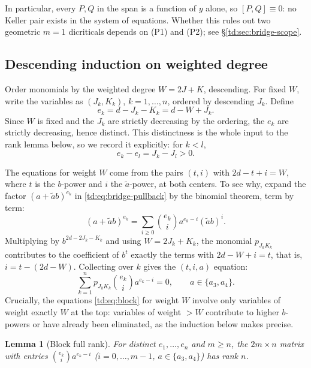 \documentclass[a4paper,11pt]{article}
\theoremstyle{plain}
\newtheorem{lemma}[theorem]{Lemma}
\theoremstyle{definition}
\theoremstyle{remark}
\begin{document}
In particular, every $P, Q$ in the span is a function of $y$ alone, so $[P,Q] \equiv 0$: no
Keller pair exists in the system of equations. Whether this rules out two geometric $m = 1$
dicriticals depends on (P1) and (P2); see \S\ref{td:sec:bridge-scope}.

\subsection{Descending induction on weighted degree}

Order monomials by the weighted degree $W = 2J + K$, descending. For fixed $W$, write the
variables as $(J_k, K_k)$, $k = 1, \dots, n$, ordered by descending $J_k$. Define
\begin{equation}\label{td:eq:ek-def}
e_k = d - J_k - K_k = d - W + J_k.
\end{equation}
Since $W$ is fixed and the $J_k$ are strictly decreasing by the ordering, the $e_k$ are
strictly decreasing, hence distinct. This distinctness is the whole input to the rank lemma
below, so we record it explicitly: for $k < l$,
\[
e_k - e_l = J_k - J_l > 0.
\]

The equations for weight $W$ come from the pairs $(t, i)$ with $2d - t + i = W$, where $t$ is
the $b$-power and $i$ the $\tilde{a}$-power, at both centers. To see why, expand the factor
$(a + \tilde{a} b)^{e_k}$ in \eqref{td:eq:bridge-pullback} by the binomial theorem, term by
term:
\[
(a + \tilde{a} b)^{e_k} = \sum_{i \geq 0} \binom{e_k}{i} a^{e_k - i} (\tilde{a} b)^i.
\]
Multiplying by $b^{2d - 2J_k - K_k}$ and using $W = 2J_k + K_k$, the monomial $p_{J_k K_k}$
contributes to the coefficient of $b^t$ exactly the terms with $2d - W + i = t$, that is,
$i = t - (2d - W)$. Collecting over $k$ gives the $(t, i, a)$ equation:
\begin{equation}\label{td:eq:block}
\sum_{k=1}^n p_{J_k K_k}\binom{e_k}{i} a^{e_k-i} = 0, \qquad a \in \{a_3, a_4\}.
\end{equation}
Crucially, the equations \eqref{td:eq:block} for weight $W$ involve only variables of weight
exactly $W$ at the top: variables of weight $> W$ contribute to higher $b$-powers or have
already been eliminated, as the induction below makes precise.

\begin{lemma}[Block full rank]\label{td:lem:block-rank}
For distinct $e_1, \dots, e_n$ and $m \geq n$, the $2m \times n$ matrix with entries
$\binom{e_k}{i} a^{e_k-i}$ ($i = 0, \dots, m-1$, $a \in \{a_3, a_4\}$) has rank $n$.
\end{lemma}
\end{document}
